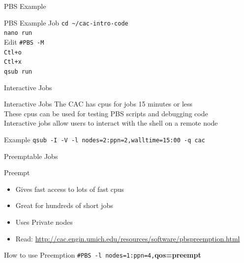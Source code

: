 \documentclass[handout]{beamer}
\begin{document}
\begin{frame}{PBS Example}
 \begin{block}{PBS Example Job}
  \texttt{cd \~{}/cac-intro-code}
  \\ \texttt{nano run}
  \\ Edit \texttt{\#PBS -M}
  \\ \texttt{Ctl+o}
  \\ \texttt{Ctl+x}
  \\ \texttt{qsub run}
 \end{block}
\end{frame}
\begin{frame}{Interactive Jobs}
 \begin{block}{Interactive Jobs}
   {The CAC has cpus for jobs 15 minutes or less \\}
   {These cpus can be used for testing PBS scripts and debugging code \\}
   {Interactive jobs allow users to interact with the shell on a remote node \\}
 \end{block}
 \begin{block}{Example}
   {\texttt{qsub -I -V -l nodes=2:ppn=2,walltime=15:00 -q cac}}
 \end{block}
\end{frame}
\begin{frame}{Preemptable Jobs}
 \begin{block}{Preempt}
  \begin{itemize}
   \item{Gives fast access to lots of fast cpus}
   \item{Great for hundreds of short jobs}
   \item{Uses Private nodes}
   \item{Read: \url{http://cac.engin.umich.edu/resources/software/pbspreemption.html}}
  \end{itemize}
 \end{block}
 \begin{block}{How to use Preemption}
  \texttt{\#PBS -l nodes=1:ppn=4,}\textbf{qos=preempt}
 \end{block}
\end{frame}
\end{document}
